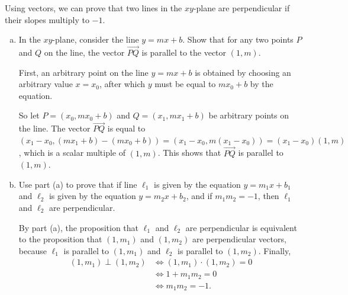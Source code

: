 \begin{problem}
  Using vectors, we can prove that two lines in the $xy$-plane are perpendicular if their slopes multiply to $-1$.
  \begin{enumerate}[(a)]
    \item In the $xy$-plane, consider the line $y=mx+b$. Show that for any two points $P$ and $Q$ on the line, the vector $\overrightarrow{PQ}$ is parallel to the vector $(1,m)$.
    \begin{solution}
      First, an arbitrary point on the line $y=mx+b$ is obtained by choosing an arbitrary value $x=x_0$, after which $y$ must be equal to $mx_0+b$ by the equation.

      So let $P=(x_0,mx_0+b)$ and $Q=(x_1,mx_1+b)$ be arbitrary points on the line. The vector $\overrightarrow{PQ}$ is equal to $(x_1-x_0,(mx_1+b)-(mx_0+b))=(x_1-x_0,m(x_1-x_0))=(x_1-x_0)(1,m)$, which is a scalar multiple of $(1,m)$. This shows that $\overrightarrow{PQ}$ is parallel to $(1,m)$.
    \end{solution}
    \item Use part (a) to prove that if line $\ell_1$ is given by the equation $y=m_1x+b_1$ and $\ell_2$ is given by the equation $y=m_2x+b_2$, and if $m_1m_2=-1$, then $\ell_1$ and $\ell_2$ are perpendicular.
    \begin{solution}
      By part (a), the proposition that $\ell_1$ and $\ell_2$ are perpendicular is equivalent to the proposition that $(1,m_1)$ and $(1,m_2)$ are perpendicular vectors, because $\ell_1$ is parallel to $(1,m_1)$ and $\ell_2$ is parallel to $(1,m_2)$. Finally,
      \[\begin{split}
        (1,m_1)\perp(1,m_2) &\iff (1,m_1)\cdot(1,m_2)=0 \\
        &\iff 1+m_1m_2=0 \\
        &\iff m_1m_2=-1.
      \end{split}\]
    \end{solution}
  \end{enumerate}
\end{problem}

